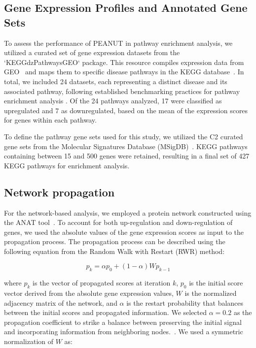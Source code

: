 \documentclass{article}
\begin{document}
\subsection{Gene Expression Profiles and Annotated Gene Sets}
To assess the performance of PEANUT in pathway enrichment analysis, we utilized a curated set of gene expression datasets from the `KEGGdzPathwaysGEO` package. This resource compiles expression data from GEO~\cite{Barrett2013} and maps them to specific disease pathways in the 
KEGG database~\cite{Kanehisa2017}. 
 In total, we included 24 datasets, each representing a distinct disease and its associated pathway, following established benchmarking practices for pathway enrichment analysis \cite{Tarca2013}. 
Of the 24 pathways analyzed, 17 were classified as upregulated and 7 as downregulated, based on the mean of the expression scores for genes within each pathway. 

To define the pathway gene sets used for this study, we utilized the C2 curated gene sets from the Molecular Signatures Database (MSigDB)~\cite{Subramanian2005,Liberzon2011,Liberzon2015}. KEGG pathways containing between 15 and 500 genes were retained, resulting in a final set of 427 KEGG pathways for enrichment analysis.

\subsection{Network propagation}

For the network-based analysis, we employed a protein network constructed using the ANAT tool~\cite{Signorini2021, Yosef2011}. To account for both up-regulation and down-regulation of genes, we used the absolute values of the gene expression scores as input to the propagation process. The propagation process can be described using the following equation from the Random Walk with Restart (RWR) method:

\[
p_k = \alpha p_0 + (1-\alpha) W p_{k-1}
\]

where \(p_k\) is the vector of propagated scores at iteration \(k\), \(p_0\) is the initial score vector derived from the absolute gene expression values, \(W\) is the normalized adjacency matrix of the network, and \(\alpha\) is the restart probability that balances between the initial scores and propagated information.
We selected \(\alpha = 0.2\) as the propagation coefficient to strike a balance between preserving the initial signal and incorporating information from neighboring nodes.~\cite{Charmpi2021,Vanunu2010}. We used a symmetric normalization of \(W\) as:
\end{document}
